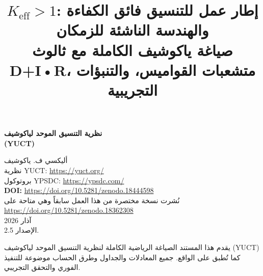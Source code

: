 \documentclass[11pt,a4paper]{article}
\title{$K_{\mathrm{eff}} > 1$: إطار عمل للتنسيق فائق الكفاءة والهندسة الناشئة للزمكان \\ 
	\large صياغة ياكوشيف الكاملة مع ثالوث D+I•R، متشعبات القواميس، والتنبؤات التجريبية}
\begin{document}
	
	\begin{titlepage}
		\begin{center}
			\vspace*{3cm}
			\Huge\textbf{نظرية التنسيق الموحد لياكوشيف\\ (YUCT)}
			\vspace{2cm}
			
			\Large
			أليكسي ف. ياكوشيف\\
			\vspace{2cm}
			نظرية YUCT: \url{https://yuct.org/}\\
			بروتوكول YPSDC: \url{https://ypsdc.com/}\\
			
			\vspace{2cm}
			\textbf{DOI:} \url{https://doi.org/10.5281/zenodo.18444598}\\
			
			\vspace{1cm}
			\large 
			نُشرت نسخة مختصرة من هذا العمل سابقاً وهي متاحة على\\
			\url{https://doi.org/10.5281/zenodo.18362308}\\
			\vspace{1cm}
			آذار 2026 \\ \large الإصدار 2.5.
			
			\vfill
			\normalsize
			يقدم هذا المستند الصياغة الرياضية الكاملة لنظرية التنسيق الموحد لياكوشيف (YUCT) كما تُطبق على الواقع. جميع المعادلات والجداول وطرق الحساب موضوعة للتنفيذ الفوري والتحقق التجريبي.
		\end{center}
	\end{titlepage}
	
	\tableofcontents
	\newpage
	
\end{document}
